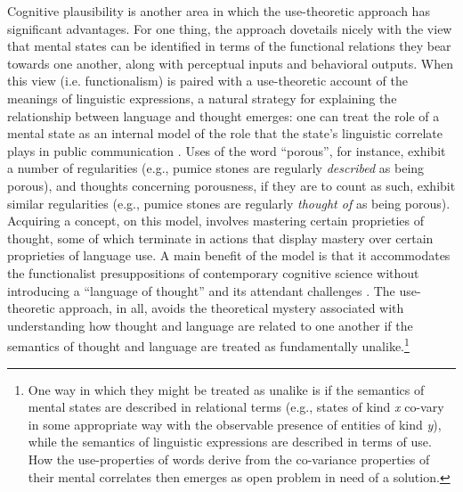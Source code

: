 Cognitive plausibility is another area in which the use-theoretic approach has significant advantages. For one thing, the approach dovetails nicely with the view that mental states can be identified in terms of the functional relations they bear towards one another, along with perceptual inputs and behavioral outputs. When this view (i.e. functionalism) is paired with a use-theoretic account of the meanings of linguistic expressions, a natural strategy for explaining the relationship between language and thought emerges: one can treat the role of a mental state as an internal model of the role that the state's linguistic correlate plays in public communication \citep{Block:1986}. Uses of the word ``porous'', for instance, exhibit a number of regularities (e.g., pumice stones are regularly \textit{described} as being porous), and thoughts concerning porousness, if they are to count as such, exhibit similar regularities (e.g., pumice stones are regularly \textit{thought of} as being porous). Acquiring a concept, on this model, involves mastering certain proprieties of thought, some of which terminate in actions that display mastery over certain proprieties of language use. A main benefit of the model is that it accommodates the functionalist presuppositions of contemporary cognitive science \citep{Fodor:1998} without introducing a ``language of thought'' and its attendant challenges \citep[see e.g.,][]{Dennett:1987}. The use-theoretic approach, in all, avoids the theoretical mystery associated with understanding how thought and language are related to one another if the semantics of thought and language are treated as fundamentally unalike.\footnote{One way in which they might be treated as unalike is if the semantics of mental states are described in relational terms (e.g., states of kind \textit{x} co-vary in some appropriate way with the observable presence of entities of kind \textit{y}), while the semantics of linguistic expressions are described in terms of use. How the use-properties of words derive from the co-variance properties of their mental correlates then emerges as open problem in need of a solution.}

